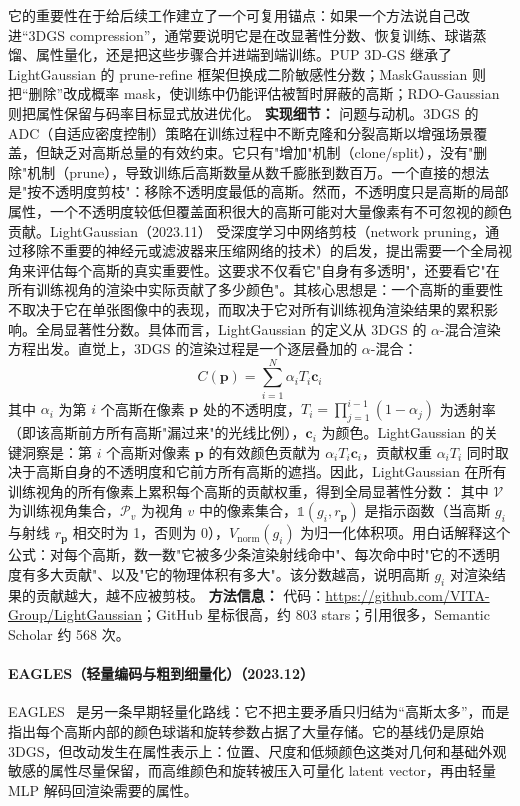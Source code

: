 它的重要性在于给后续工作建立了一个可复用锚点：如果一个方法说自己改进“3DGS compression”，通常要说明它是在改显著性分数、恢复训练、球谐蒸馏、属性量化，还是把这些步骤合并进端到端训练。PUP 3D-GS 继承了 LightGaussian 的 prune-refine 框架但换成二阶敏感性分数；MaskGaussian 则把“删除”改成概率 mask，使训练中仍能评估被暂时屏蔽的高斯；RDO-Gaussian 则把属性保留与码率目标显式放进优化。
\textbf{实现细节：} 问题与动机。3DGS 的 ADC（自适应密度控制）策略在训练过程中不断克隆和分裂高斯以增强场景覆盖，但缺乏对高斯总量的有效约束。它只有"增加"机制（clone/split），没有"删除"机制（prune），导致训练后高斯数量从数千膨胀到数百万。一个直接的想法是"按不透明度剪枝"：移除不透明度最低的高斯。然而，不透明度只是高斯的局部属性，一个不透明度较低但覆盖面积很大的高斯可能对大量像素有不可忽视的颜色贡献。LightGaussian（2023.11） 受深度学习中网络剪枝（network pruning，通过移除不重要的神经元或滤波器来压缩网络的技术）的启发，提出需要一个全局视角来评估每个高斯的真实重要性。这要求不仅看它"自身有多透明"，还要看它"在所有训练视角的渲染中实际贡献了多少颜色"。其核心思想是：一个高斯的重要性不取决于它在单张图像中的表现，而取决于它对所有训练视角渲染结果的累积影响。全局显著性分数。具体而言，LightGaussian 的定义从 3DGS 的 $\alpha$-混合渲染方程出发。直觉上，3DGS 的渲染过程是一个逐层叠加的 $\alpha$-混合： \[ C(\mathbf{p}) = \sum_{i=1}^{N} \alpha_i T_i \mathbf{c}_i \] 其中 $\alpha_i$ 为第 $i$ 个高斯在像素 $\mathbf{p}$ 处的不透明度，$T_i = \prod_{j=1}^{i-1}(1-\alpha_j)$ 为透射率（即该高斯前方所有高斯"漏过来"的光线比例），$\mathbf{c}_i$ 为颜色。LightGaussian 的关键洞察是：第 $i$ 个高斯对像素 $\mathbf{p}$ 的有效颜色贡献为 $\alpha_i T_i \mathbf{c}_i$，贡献权重 $\alpha_i T_i$ 同时取决于高斯自身的不透明度和它前方所有高斯的遮挡。因此，LightGaussian 在所有训练视角的所有像素上累积每个高斯的贡献权重，得到全局显著性分数： 其中 $\mathcal{V}$ 为训练视角集合，$\mathcal{P}_v$ 为视角 $v$ 中的像素集合，$\mathbb{1}(g_i, r_{\mathbf{p}})$ 是指示函数（当高斯 $g_i$ 与射线 $r_{\mathbf{p}}$ 相交时为 1，否则为 0），$V_{\mathrm{norm}}(g_i)$ 为归一化体积项。用白话解释这个公式：对每个高斯，数一数"它被多少条渲染射线命中"、每次命中时"它的不透明度有多大贡献"、以及"它的物理体积有多大"。该分数越高，说明高斯 $g_i$ 对渲染结果的贡献越大，越不应被剪枝。
\textbf{方法信息：} 代码：\url{https://github.com/VITA-Group/LightGaussian}；GitHub 星标很高，约 803 stars；引用很多，Semantic Scholar 约 568 次。



\paragraph{EAGLES（轻量编码与粗到细量化）（2023.12）}
EAGLES~\cite{2312_04564} 是另一条早期轻量化路线：它不把主要矛盾只归结为“高斯太多”，而是指出每个高斯内部的颜色球谐和旋转参数占据了大量存储。它的基线仍是原始 3DGS，但改动发生在属性表示上：位置、尺度和低频颜色这类对几何和基础外观敏感的属性尽量保留，而高维颜色和旋转被压入可量化 latent vector，再由轻量 MLP 解码回渲染需要的属性。


